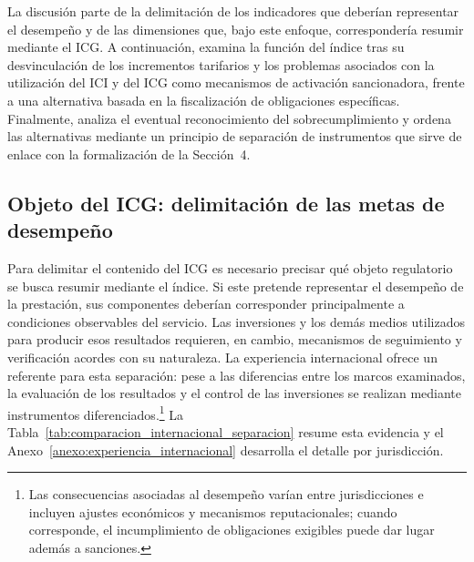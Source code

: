 La discusión parte de la delimitación de los indicadores que deberían representar el desempeño y de las dimensiones que, bajo este enfoque, correspondería resumir mediante el ICG. A continuación, examina la función del índice tras su desvinculación de los incrementos tarifarios y los problemas asociados con la utilización del ICI y del ICG como mecanismos de activación sancionadora, frente a una alternativa basada en la fiscalización de obligaciones específicas. Finalmente, analiza el eventual reconocimiento del sobrecumplimiento y ordena las alternativas mediante un principio de separación de instrumentos que sirve de enlace con la formalización de la Sección~4.

\subsection{Objeto del ICG: delimitación de las metas de desempeño}

Para delimitar el contenido del ICG es necesario precisar qué objeto regulatorio se busca resumir mediante el índice. Si este pretende representar el desempeño de la prestación, sus componentes deberían corresponder principalmente a condiciones observables del servicio. Las inversiones y los demás medios utilizados para producir esos resultados requieren, en cambio, mecanismos de seguimiento y verificación acordes con su naturaleza. La experiencia internacional ofrece un referente para esta separación: pese a las diferencias entre los marcos examinados, la evaluación de los resultados y el control de las inversiones se realizan mediante instrumentos diferenciados.\footnote{Las consecuencias asociadas al desempeño varían entre jurisdicciones e incluyen ajustes económicos y mecanismos reputacionales; cuando corresponde, el incumplimiento de obligaciones exigibles puede dar lugar además a sanciones.} La Tabla~\ref{tab:comparacion_internacional_separacion} resume esta evidencia y el Anexo~\ref{anexo:experiencia_internacional} desarrolla el detalle por jurisdicción.


